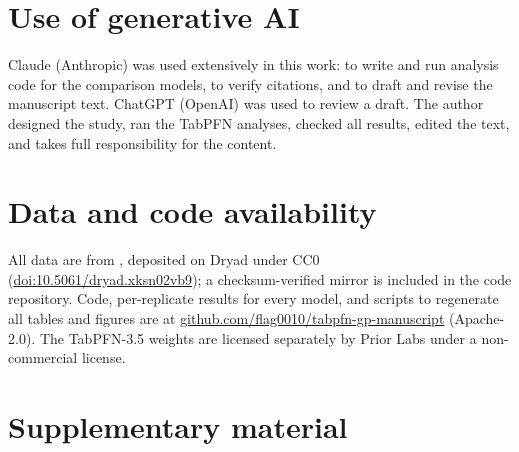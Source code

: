 \documentclass[11pt]{article}
\begin{document}
\section*{Use of generative AI}

Claude (Anthropic) was used extensively in this work: to write and run analysis code for the comparison models, to verify citations, and to draft and revise the manuscript text. ChatGPT (OpenAI) was used to review a draft. The author designed the study, ran the TabPFN analyses, checked all results, edited the text, and takes full responsibility for the content.

\section*{Data and code availability}

All data are from \citet{azodi2019}, deposited on Dryad under CC0 (\href{https://doi.org/10.5061/dryad.xksn02vb9}{doi:10.5061/dryad.xksn02vb9}); a checksum-verified mirror is included in the code repository. Code, per-replicate results for every model, and scripts to regenerate all tables and figures are at \href{https://github.com/flag0010/tabpfn-gp-manuscript}{github.com/flag0010/tabpfn-gp-manuscript} (Apache-2.0). The TabPFN-3.5 weights are licensed separately by Prior Labs under a non-commercial license.



\clearpage
\appendix
\renewcommand{\thetable}{S\arabic{table}}
\setcounter{table}{0}
\section*{Supplementary material}

\begin{table}[htbp]
\centering
\caption{Mean accuracy (Pearson $r$) of every model on each species-trait test. TabPFN-3.5 and the comparison models are means over the same 10 replicate 80/20 splits. TabPFN-3.5 received raw markers for soybean and spruce and the hybrid input (100 PCs + 19,900 thinned markers) for the other four species. GBLUP-thin was run only where thinning was needed. ENet used all markers for soybean and spruce; $^\dagger$ marks ENet fit on the hybrid input. Fits where ENet kept no markers are counted as $r = 0$. Best published values are from Table S5 of \citet{azodi2019}, computed on different random splits; the last column ranks TabPFN-3.5 among those 18 published means.}
\label{tab:s1}
\footnotesize
\setlength{\tabcolsep}{3.5pt}
\resizebox{\linewidth}{!}{}
\end{table}
\end{document}
